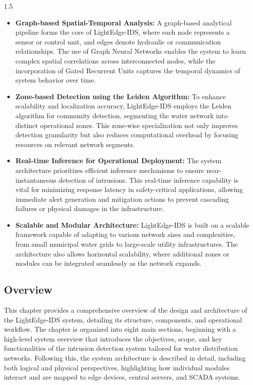 \begin{spacing}{1.5}
\begin{itemize}
    \item \textbf{Graph-based Spatial-Temporal Analysis:}  
    A graph-based analytical pipeline forms the core of LightEdge-IDS, where each node represents a sensor or control unit, and edges denote hydraulic or communication relationships. The use of Graph Neural Networks enables the system to learn complex spatial correlations across interconnected nodes, while the incorporation of Gated Recurrent Units captures the temporal dynamics of system behavior over time.

    \item \textbf{Zone-based Detection using the Leiden Algorithm:}  
    To enhance scalability and localization accuracy, LightEdge-IDS employs the Leiden algorithm for community detection, segmenting the water network into distinct operational zones. This zone-wise specialization not only improves detection granularity but also reduces computational overhead by focusing resources on relevant network segments.

    \item \textbf{Real-time Inference for Operational Deployment:}  
    The system architecture prioritizes efficient inference mechanisms to ensure near-instantaneous detection of intrusions. This real-time inference capability is vital for minimizing response latency in safety-critical applications, allowing immediate alert generation and mitigation actions to prevent cascading failures or physical damages in the infrastructure.

    \item \textbf{Scalable and Modular Architecture:}  
    LightEdge-IDS is built on a scalable framework capable of adapting to various network sizes and complexities, from small municipal water grids to large-scale utility infrastructures. The architecture also allows horizontal scalability, where additional zones or modules can be integrated seamlessly as the network expands.

\end{itemize}



\subsection{Overview}

This chapter provides a comprehensive overview of the design and architecture of the LightEdge-IDS system, detailing its structure, components, and operational workflow. The chapter is organized into eight main sections, beginning with a high-level system overview that introduces the objectives, scope, and key functionalities of the intrusion detection system tailored for water distribution networks. Following this, the system architecture is described in detail, including both logical and physical perspectives, highlighting how individual modules interact and are mapped to edge devices, central servers, and SCADA systems.  


\end{spacing}
